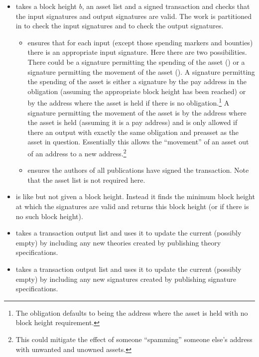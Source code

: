 \begin{itemize}
\item {} takes a block height $b$, an asset list
and a signed transaction and checks that the input signatures and output signatures
are valid.
The work is partitioned in {}
to check the input signatures
and {}
to check the output signatures.
\begin{itemize}
\item {} ensures that for each input
(except those spending markers and bounties)
there is an appropriate input signature. Here there are two possibilities.
There could be a signature permitting the spending of the asset ({})
or a signature permitting the movement of the asset ({}).
A signature permitting the spending of the asset is either a signature
by the pay address in the obligation (assuming the appropriate block height has been reached)
or by the address where the asset is held if there is no obligation.\footnote{The obligation {} defaults
to being the address where the asset is held with no block height requirement.}
A signature permitting the movement of the asset is by the address where the asset is held (assuming it is
a pay address) and is only allowed if there an output with exactly the same obligation and preasset
as the asset in question.
Essentially this allows the ``movement'' of an asset out of an address to a new address.\footnote{This could mitigate the effect of someone ``spamming'' someone else's address with unwanted and unowned assets.}
\item {} ensures the authors of all publications
have signed the transaction. Note that the asset list is not required here.
\end{itemize}
\item {} is like {}
but not given a block height. Instead it finds the minimum block height at which the
signatures are valid and returns this block height (or {} if there is no such block height).
\item {} takes a transaction output list
and uses it to update the current (possibly empty) {} by including any new
theories created by publishing theory specifications.
\item {} takes a transaction output list
and uses it to update the current (possibly empty) {} by including any new
signatures created by publishing signature specifications.
\end{itemize}

